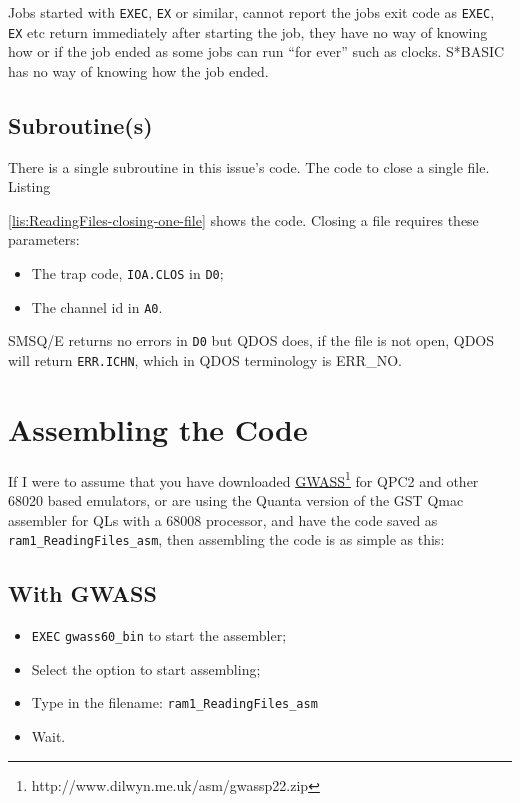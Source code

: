 Jobs started with \texttt{EXEC}, \texttt{EX} or similar, cannot report
the jobs exit code as \texttt{EXEC}, \texttt{EX} etc return immediately
after starting the job, they have no way of knowing how or if the
job ended as some jobs can run ``for ever'' such as clocks. S{*}BASIC
has no way of knowing how the job ended.

\subsection{Subroutine(s)}

There is a single subroutine in this issue's code. The code to close
a single file. Listing 

\ref{lis:ReadingFiles-closing-one-file} shows the code. Closing a
file requires these parameters:
\begin{itemize}
\item The trap code, \texttt{IOA.CLOS} in \texttt{D0};
\item The channel id in \texttt{A0}.
\end{itemize}
SMSQ/E returns no errors in \texttt{D0} but QDOS does, if the file
is not open, QDOS will return \texttt{ERR.ICHN}, which in QDOS terminology
is ERR\_NO.



\section{Assembling the Code}

If I were to assume that you have downloaded \href{http://www.dilwyn.me.uk/asm/gwassp22.zip}{GWASS}\footnote{http://www.dilwyn.me.uk/asm/gwassp22.zip}
for QPC2 and other 68020 based emulators, or are using the Quanta
version of the GST Qmac assembler for QLs with a 68008 processor,
and have the code saved as \texttt{ram1\_ReadingFiles\_asm}, then
assembling the code is as simple as this:

\subsection{With GWASS}
\begin{itemize}
\item \texttt{EXEC} \texttt{gwass60\_bin} to start the assembler;
\item Select the option to start assembling;
\item Type in the filename: \texttt{ram1\_ReadingFiles\_asm}
\item Wait.
\end{itemize}

